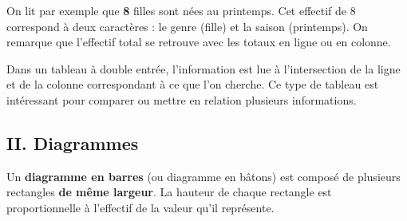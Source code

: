 \begin{Exemple}
\begin{center}
\end{center}

On lit par exemple que \textbf{\textcolor{Couleur8}{8}} filles sont nées au printemps. Cet effectif de 8 correspond à deux caractères : le genre (fille) et la saison (printemps).
On remarque que l'effectif total se retrouve avec les totaux en ligne ou en colonne.
\end{Exemple}

\begin{Remarque}
Dans un tableau à double entrée, l'information est lue à l'intersection de la ligne et de la colonne correspondant à ce que l'on cherche. Ce type de tableau est intéressant pour comparer ou mettre en relation plusieurs informations.
\end{Remarque}

\newpage
\subsection*{II. Diagrammes}

\begin{Définition}
Un \textbf{diagramme en barres} (ou diagramme en bâtons) est composé de plusieurs rectangles \textbf{de même largeur}. La hauteur de chaque rectangle est proportionnelle à l'effectif de la valeur qu'il représente.
\end{Définition}


